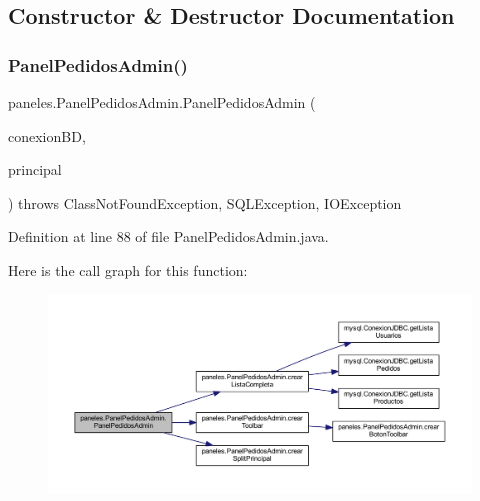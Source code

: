 \subsection{Constructor \& Destructor Documentation}
\mbox{\label{classpaneles_1_1_panel_pedidos_admin_abe62da27a8eab1d1ff135f2d0afd1924}} 
\subsubsection{\texorpdfstring{Panel\+Pedidos\+Admin()}{PanelPedidosAdmin()}}
{\footnotesize\ttfamily paneles.\+Panel\+Pedidos\+Admin.\+Panel\+Pedidos\+Admin (\begin{DoxyParamCaption}\item[{\mbox{\hyperlink{classmysql_1_1_conexion_j_d_b_c}{Conexion\+J\+D\+BC}}}]{conexion\+BD,  }\item[{\mbox{\hyperlink{classvistas_1_1_principal}{Principal}}}]{principal }\end{DoxyParamCaption}) throws Class\+Not\+Found\+Exception, S\+Q\+L\+Exception, I\+O\+Exception}



Definition at line 88 of file Panel\+Pedidos\+Admin.\+java.

Here is the call graph for this function\+:\nopagebreak
\begin{figure}[H]
\begin{center}
\leavevmode
\includegraphics[width=350pt]{classpaneles_1_1_panel_pedidos_admin_abe62da27a8eab1d1ff135f2d0afd1924_cgraph}
\end{center}
\end{figure}


